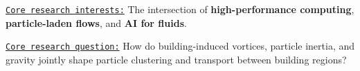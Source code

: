 
\begin{cvparagraph}
  \underline{\texttt{Core research interests:}}
  The intersection of \textbf{high-performance computing},
  \textbf{particle-laden flows}, and \textbf{AI for fluids}.

  \vspace{0.7em}
  \underline{\texttt{Core research question:}}
  How do building-induced vortices, particle inertia, and gravity jointly shape
  particle clustering and transport between building regions?
\end{cvparagraph}
